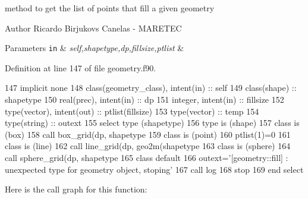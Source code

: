 method to get the list of points that fill a given geometry 

\begin{DoxyAuthor}{Author}
Ricardo Birjukovs Canelas -\/ M\+A\+R\+E\+T\+EC 
\end{DoxyAuthor}

\begin{DoxyParams}[1]{Parameters}
\mbox{\tt in}  & {\em self,shapetype,dp,fillsize,ptlist} & \\
\hline
\end{DoxyParams}


Definition at line 147 of file geometry.\+f90.


\begin{DoxyCode}
147     \textcolor{keywordtype}{implicit none}
148     \textcolor{keywordtype}{class}(geometry\_class), \textcolor{keywordtype}{intent(in)} :: self
149     \textcolor{keywordtype}{class}(shape) :: shapetype
150     \textcolor{keywordtype}{real(prec)}, \textcolor{keywordtype}{intent(in)} :: dp
151     \textcolor{keywordtype}{integer}, \textcolor{keywordtype}{intent(in)} :: fillsize
152     \textcolor{keywordtype}{type}(vector), \textcolor{keywordtype}{intent(out)} :: ptlist(fillsize)
153     \textcolor{keywordtype}{type}(vector) :: temp
154     \textcolor{keywordtype}{type}(string) :: outext
155     \textcolor{keywordflow}{select type} (shapetype)
156 \textcolor{keywordflow}{    type is} (shape)
157 \textcolor{keywordflow}{    class is} (box)
158         \textcolor{keyword}{call }box\_grid(dp, shapetype%
159 \textcolor{keywordflow}{    class is} (point)
160         ptlist(1)=0
161 \textcolor{keywordflow}{    class is} (line)
162         \textcolor{keyword}{call }line\_grid(dp, geo2m(shapetype%
163 \textcolor{keywordflow}{    class is} (sphere)
164         \textcolor{keyword}{call }sphere\_grid(dp, shapetype%
165 \textcolor{keywordflow}{        class default}
166         outext=\textcolor{stringliteral}{'[geometry::fill] : unexpected type for geometry object, stoping'}
167         \textcolor{keyword}{call }log%
168         stop
169 \textcolor{keywordflow}{    end select}
\end{DoxyCode}
Here is the call graph for this function\+:
\nopagebreak
